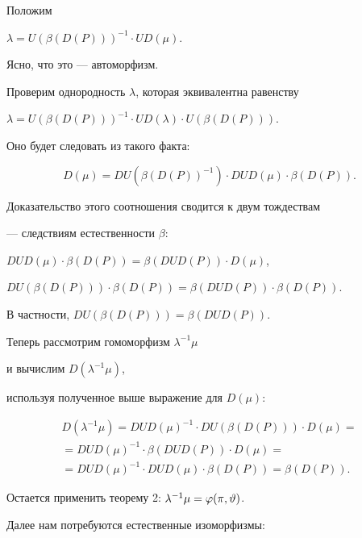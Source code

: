 \begin{pf} Положим


$\lambda=U(\beta(D(P)))^{-1}\cdot UD(\mu)$.


Ясно, что это --- автоморфизм.


Проверим однородность $ \lambda$, которая эквивалентна равенству


$\lambda=U(\beta(D(P)))^{-1}\cdot UD(\lambda)\cdot U(\beta(D(P)))$.


Оно будет следовать из такого факта:


$$


D(\mu)=DU(\beta(D(P))^{-1})\cdot DUD(\mu)\cdot\beta(D(P)).


$$





Доказательство этого соотношения сводится к двум тождествам


--- следствиям естественности $\beta $: 


$DUD(\mu)\cdot\beta(D(P))=\beta(DUD(P))\cdot D(\mu)$,


$DU(\beta(D(P)))\cdot \beta(D(P))=\beta(DUD(P))\cdot \beta(D(P))$.





В частности, $DU(\beta(D(P)))= \beta(DUD(P))$.


Теперь рассмотрим гомоморфизм $\lambda^{-1}\mu$


и вычислим $ D(\lambda^{-1}\mu)$,


используя полученное выше выражение для $D(\mu)$:


\begin{gather*}


D(\lambda^{-1}\mu)=DUD(\mu)^{-1}\cdot DU(\beta(D(P)))\cdot D(\mu)=\\


=DUD(\mu)^{-1}\cdot\beta(DUD(P))\cdot D(\mu)= \\


=DUD(\mu)^{-1}\cdot DUD(\mu)\cdot \beta(D(P))=\beta(D(P)).


\end{gather*}





Остается применить теорему 2: ${\lambda}^{-1}\mu=\varphi(\pi,\vartheta)$.


\end{pf}





Далее нам потребуются естественные изоморфизмы:


